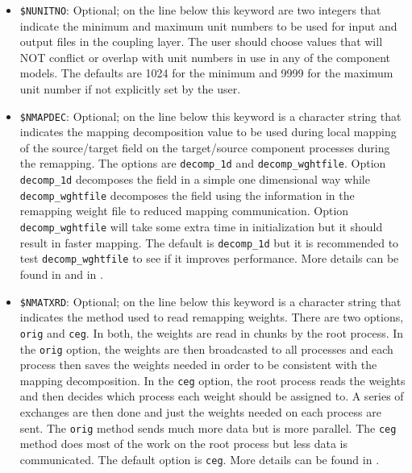 \begin{itemize}
\item {\tt \$NUNITNO}: Optional; on the line below this keyword are two integers
  that indicate the minimum and maximum unit numbers to be used for
  input and output files in the coupling layer.  The user should
  choose values that will NOT conflict or overlap with unit numbers in
  use in any of the component models. The defaults are 1024 for the minimum and 9999
  for the maximum unit number if not explicitly set by the user.

\item {\tt \$NMAPDEC}: Optional; on the line below this keyword is a character string
  that indicates the mapping decomposition value to be used during local mapping of the source/target field on the target/source component processes during the remapping.  The
  options are {\tt decomp\_1d} and {\tt decomp\_wghtfile}.  Option {\tt decomp\_1d} decomposes the field in a simple
  one dimensional way while {\tt decomp\_wghtfile} decomposes the field using the
  information in the remapping weight file to reduced mapping communication. Option {\tt decomp\_wghtfile}
  will take some extra time in initialization but it should result in faster mapping.
  The default is {\tt decomp\_1d} but it is recommended to test {\tt decomp\_wghtfile} to see if it improves performance. 
  More details can be found in \cite {craig18} and in \cite{valcke11}.

\item {\tt \$NMATXRD}: Optional; on the line below this keyword is a character string
  that indicates the method used to read remapping weights.  There are two options, {\tt orig}
  and {\tt ceg}.  In both, the weights are read in chunks by the root process.  In the {\tt orig} option,
  the weights are then broadcasted to all processes and each process then saves the weights needed in
  order to be consistent with the mapping decomposition.  In the {\tt ceg} option, the root process
  reads the weights and then decides which process each weight should be assigned to.  A
  series of exchanges are then done and just the weights needed on
  each process are sent.  The {\tt orig} method sends much more data but is more parallel.  The {\tt ceg}
  method does most of the work on the root process but less data is communicated.  The default option
  is {\tt ceg}. More details can be found in \cite {craig18}.


\end{itemize}
